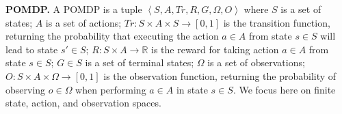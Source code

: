 \documentclass[letterpaper]{article} %
\newcommand{\tuple}[1]{\ensuremath{\left \langle #1 \right \rangle }}
\newcommand{\guy}[1]{\textcolor{blue}{[Guy: #1]}}
\newcommand{\inon}[1]{ }
\begin{document}
\noindent\textbf{POMDP.} A POMDP is a tuple $\tuple{S,A,Tr,R,G,\Omega,O}$ where 
 $S$ is a set of states; 
 $A$ is a set of actions; 
 $Tr: S \times A \times S \rightarrow [0,1]$ is the transition function, returning the probability that executing the action $a \in A$ from state $s \in S$ will lead to state $s' \in S$;
$R: S \times A \rightarrow \mathbb{R} $ is the reward for taking action $a \in A$ from state $s \in S$;
$G \in S$ is a set of terminal states; 
$\Omega$ is a set of observations;
$O:S\times A\times\Omega\rightarrow [0,1]$ is the observation function, returning the probability of observing $o\in\Omega$ when performing $a\in A$ in state $s\in S$. 
We focus here on finite state, action, and observation spaces. %
\end{document}
